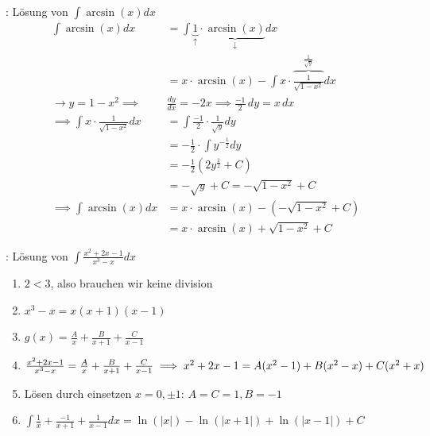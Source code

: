 \begin{minipage}{\linewidth}
\Bsp {}: Lösung von $\displaystyle \int \arcsin(x) dx$
\vspace{-0.6em}
\begin{align*}
    \int \arcsin(x) dx &= \int \underbrace{1}_\uparrow \cdot \underbrace{\arcsin(x)}_\downarrow dx \\[-2.6em]
                       &= x \cdot \arcsin(x) - \int x \cdot \overbrace{\frac{1}{\sqrt{1-x^2}}}^{\frac{1}{\sqrt{y}}} dx \\
    \longrightarrow y = 1 - x^2 \implies& \frac{dy}{dx} = -2x \implies \frac{-1}{2} \, dy = x \, dx \\[-0.1em]
    \implies \int x \cdot \frac{1}{\sqrt{1-x^2}} dx &= \int \frac{-1}{2} \cdot \frac{1}{\sqrt{y}} dy \\[-0.1em]
                       &= -\frac{1}{2} \cdot \int y^{-\frac{1}{2}} dy \\[-0.3em]
                       &= -\frac{1}{2} (2y^{\frac{1}{2}} + C) \\[-0.3em]
                       &= -\sqrt{y} + C = -\sqrt{1-x^2} + C \\
    \implies \int \arcsin(x) dx &= x \cdot \arcsin(x) - (-\sqrt{1 - x^2} + C) \\[-0.8em]
                                &= x \cdot \arcsin(x) + \sqrt{1 - x^2} + C
\end{align*}
\end{minipage}

\begin{minipage}{\linewidth}
\Bsp {}: Lösung von $\displaystyle \int \frac{x^2 + 2x - 1}{x^3 - x} dx$
\vspace{-0.6em}
\begin{enumerate}
    \item $2 < 3$, also brauchen wir keine division
    \item $x^3 - x = x(x+1)(x-1)$
    \item $g(x) = \frac{A}{x} + \frac{B}{x + 1} + \frac{C}{x - 1}$
    \item $\frac{x^2 + 2x - 1}{x^3 - x} = \frac{A}{x} + \frac{B}{x + 1} + \frac{C}{x - 1} \\
    \implies x^2 + 2x -1 = A(x^2 - 1) + B(x^2 - x) + C(x^2 + x)$
    \item Lösen durch einsetzen $x = 0, \pm 1$: $A = C = 1, B = -1$
    \item $\displaystyle \int \frac{1}{x} + \frac{-1}{x+1} + \frac{1}{x-1} dx = \ln(|x|) - \ln(|x+1|) + \ln(|x-1|) + C$
\end{enumerate}
\end{minipage}

